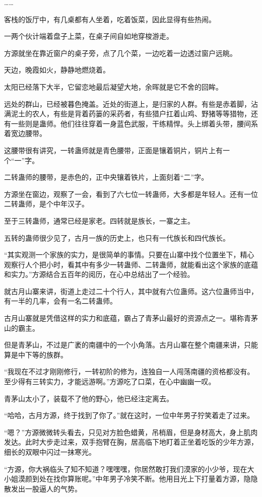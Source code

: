 \begin{this_body}
……

客栈的饭厅中，有几桌都有人坐着，吃着饭菜，因此显得有些热闹。

一两个伙计端着盘子上菜，在桌子间自如地穿梭游走。

方源就坐在靠近窗户的桌子旁，点了几个菜，一边吃着一边透过窗户远眺。

天边，晚霞如火，静静地燃烧着。

太阳已经落下大半，它留恋地最后凝望大地，余晖就是它不舍的回眸。

远处的群山，已经被暮色掩盖。近处的街道上，是归家的人群。有些是赤着脚，沾满泥土的农人，有些是背着药篓的采药者，有些猎户扛着山鸡、野猪等等猎物，还有一些则是蛊师。他们往往穿着一身蓝色武服，干练精悍。头上绑着头带，腰间系着宽边腰带。

这腰带很有讲究，一转蛊师就是青色腰带，正面是镶着铜片，铜片上有一个“一”字。

二转蛊师的腰带，是赤色的，正中央镶着铁片，上面刻着“二”字。

方源坐在窗边，观察了一会，看到了六七位一转蛊师，大多都是年轻人。还有一位二转蛊师，是个中年汉子。

至于三转蛊师，通常已经是家老。四转就是族长，一寨之主。

五转的蛊师很少见了，古月一族的历史上，也只有一代族长和四代族长。

“其实观测一个家族的实力，是很简单的事情。只要在山寨中找个位置坐下，精心观察行人个把小时，看其中有多少一转蛊师、二转蛊师，就能看出这个家族的底蕴和实力。”方源结合五百年的阅历，在心中总结出了一个经验。

就古月山寨来讲，街道上走过二十个行人，其中就有六位蛊师。这六位蛊师当中，有一半的几率，会有一名二转蛊师。

古月山寨就是凭借这样的实力和底蕴，霸占了青茅山最好的资源点之一。堪称青茅山的霸主。

但是青茅山，不过是广袤的南疆中的一个小角落。古月山寨在整个南疆来讲，只能算是中下等的族群。

“我现在不过才刚刚修行，一转初阶的修为，连独自一人闯荡南疆的资格都没有。至少得有三转实力，才能远游啊。”方源吃了口菜，在心中幽幽一叹。

青茅山太小了，装载不了他的野心，他已经注定离去。

“哈哈，古月方源，终于找到了你了。”就在这时，一位中年男子狞笑着走了过来。

“嗯？”方源微微转头看去，只见对方脸色蜡黄，吊梢眉，但是身材高大，身上肌肉发达。此时大步走过来，双手抱臂在胸，居高临下地盯着正坐着吃饭的少年方源，细长的双眼中闪过一抹寒光。

“方源，你大祸临头了知不知道？嘿嘿嘿，你居然敢打我们漠家的小少爷，现在大小姐漠颜到处在找你算账呢。”中年男子冷笑不断。他用目光上下打量着方源，隐隐散发出一股逼人的气势。

\end{this_body}

